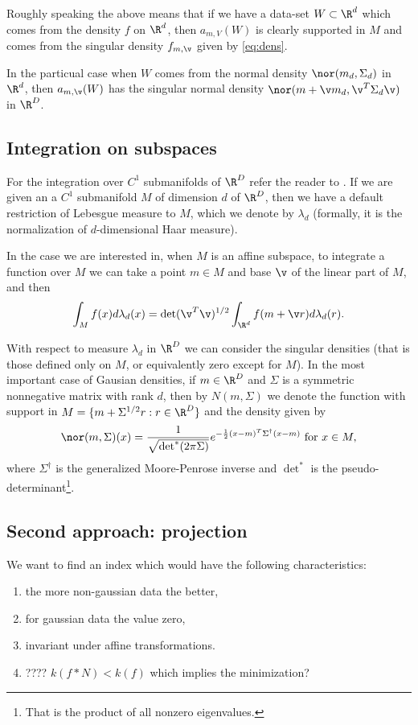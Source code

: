 Roughly speaking the above means that if we have a data-set $W \subset \R^d$ which comes from the density $f$ on $\R^d$, then $a_{m,V}(W)$ is clearly supported in $M$ and comes from the singular density $f_{m,\v}$ given by 
\eqref{eq:dens}.

In the particual case when $W$ comes from the normal density $\nor(m_d,\Sigma_d)$ in $\R^d$, then $a_{m,\v}(W)$ has the singular normal density $\nor(m+\v m_d,\v^T \Sigma_d \v )$ in $\R^D$.


\subsection{Integration on subspaces}

For the integration over $C^1$ submanifolds of $\R^D$ refer the reader to  \cite{munkres1997analysis, federer2014geometric}. If we are given an a $C^1$ submanifold $M$  of dimension $d$ of $\R^D$, then we have a default restriction of Lebesgue measure to $M$, which we denote by $\lambda_d$ (formally, it is the normalization of $d$-dimensional Haar measure).

In the case we are interested in, when $M$ is an affine subspace, to integrate
a function over $M$ we can take a point $m \in M$ and base $\v$ of the linear part
of $M$, and then
$$
\int_M f(x) d\lambda_d(x)=\det(\v^T\v)^{1/2} \int_{\R^d} f(m+\v r) d\lambda_d(r).
$$

With respect to measure $\lambda_d$ in $\R^D$ we can consider the 
singular densities (that is those defined only on $M$, or equivalently zero 
except for $M$). In the most important case of Gausian densities, if $m \in \R^D$ and $\Sigma$ is a symmetric nonnegative 
matrix with rank $d$, then by $N(m,\Sigma)$ we denote the function with support
in $M=\{m+\Sigma^{1/2}r : r\in \R^D\}$ and the density given by
$$
\nor(m,\Sigma)(x)=\frac{1}{\sqrt{\det^{*}(2\pi \Sigma )}} e^{-\frac{1}{2}(x -m)^T{\Sigma }^\dagger (x -m)} \text{ for } x \in M,
$$
where $\Sigma^\dagger$ is the generalized Moore-Penrose inverse and $\det^*$ is the pseudo-determinant\footnote{That is the product of all nonzero eigenvalues.}.

\subsection{Second approach: projection}

We want to find an index which would have the following characteristics:
\begin{enumerate}
\item the more non-gaussian data the better,
\item for gaussian data the value zero,
\item invariant under affine transformations.
\item ???? $k(f * N) <k(f)$ which implies the minimization?
\end{enumerate}


